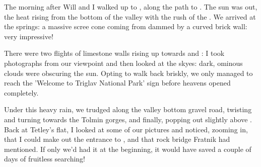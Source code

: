 The morning after Will and I walked up to , along the path to . The sun was out, the heat rising from the bottom of the valley with the rush of the . We arrived at the springs: a massive scree cone coming from  dammed by a curved brick wall: very impressive! 
 
There were two flights of limestone walls rising up towards  and : I took photographs from our viewpoint and then looked at the skyes: dark, ominous clouds were obscuring the sun. Opting to walk back briskly, we only managed to reach the 'Welcome to Triglav National Park' sign before heavens opened completely. 

Under this heavy rain, we trudged along the valley bottom gravel road, twisting and turning towards the Tolmin gorges, and finally, popping out slightly above . Back at Tetley's flat, I looked at some of our pictures and noticed, zooming in, that I could make out the entrance to , and that rock bridge Fratnik had mentioned. If only we'd had it at the beginning, it would have saved a couple of days of fruitless searching! 
 
